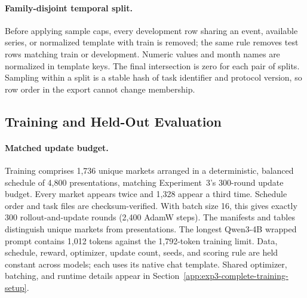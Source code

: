\paragraph{Family-disjoint temporal split.}
Before applying sample caps, every development row sharing an event, available
series, or normalized template with train is removed; the same rule removes test
rows matching train or development. Numeric values and month names are normalized
in template keys. The final intersection is zero for each pair of splits. Sampling
within a split is a stable hash of task identifier and protocol version, so row
order in the export cannot change membership.

\subsection{Training and Held-Out Evaluation}

\paragraph{Matched update budget.}
Training comprises 1,736 unique markets arranged in a deterministic, balanced
schedule of 4,800 presentations, matching Experiment~3's 300-round update budget.
Every market appears twice and 1,328 appear a third time. Schedule order and task
files are checksum-verified. With batch size 16, this gives exactly 300
rollout-and-update rounds (2,400 AdamW steps). The manifests and tables distinguish
unique markets from presentations. The longest Qwen3-4B wrapped prompt contains
1,012 tokens against the 1,792-token training limit. Data, schedule, reward,
optimizer, update count, seeds, and scoring rule are held constant across models;
each uses its native chat template.
Shared optimizer, batching, and runtime details appear in
Section~\ref{app:exp3-complete-training-setup}.

